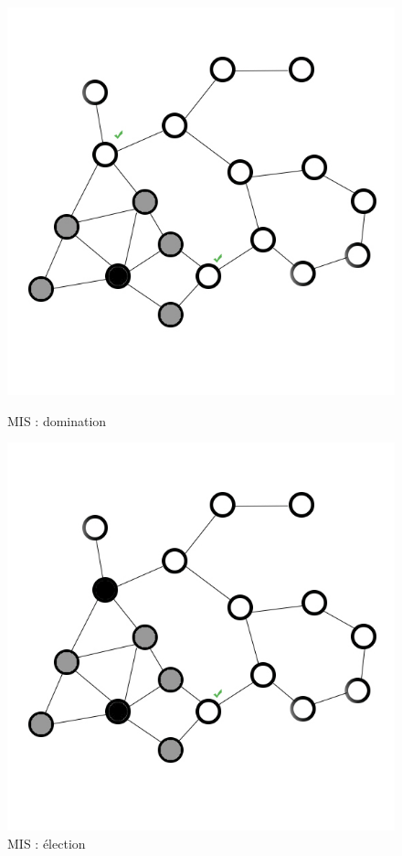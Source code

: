 \begin{figure}
    \begin{minipage}[c]{.46\linewidth}
        \includegraphics{images/mis3.jpg}
        \caption{MIS : domination}
        \label{mis3}
    \end{minipage} \hfill
    \begin{minipage}[c]{.46\linewidth}
        \includegraphics{images/mis4.jpg}
    \caption{MIS : élection}
    \label{mis4}
    \end{minipage}
\end{figure}

